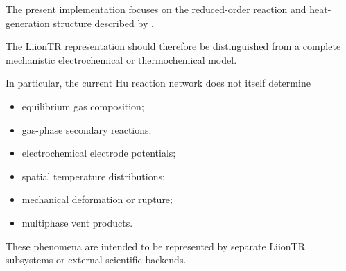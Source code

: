 The present implementation focuses on the reduced-order reaction and
heat-generation structure described by \textcite{hu2020inhibition}.

The LiionTR representation should therefore be distinguished from a
complete mechanistic electrochemical or thermochemical model.

In particular, the current Hu reaction network does not itself determine

\begin{itemize}
    \item equilibrium gas composition;
    \item gas-phase secondary reactions;
    \item electrochemical electrode potentials;
    \item spatial temperature distributions;
    \item mechanical deformation or rupture;
    \item multiphase vent products.
\end{itemize}

These phenomena are intended to be represented by separate LiionTR
subsystems or external scientific backends.